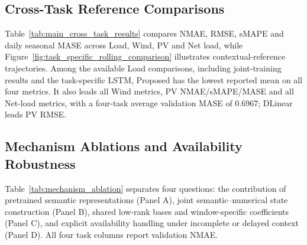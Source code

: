 \documentclass[journal]{IEEEtran}
\begin{document}
\subsection{Cross-Task Reference Comparisons}

Table~\ref{tab:main_cross_task_results} compares NMAE, RMSE, sMAPE and daily seasonal MASE across Load, Wind, PV and Net load, while Figure~\ref{fig:task_specific_rolling_comparison} illustrates contextual-reference trajectories. Among the available Load comparisons, including joint-training results and the task-specific LSTM, Proposed has the lowest reported mean on all four metrics. It also leads all Wind metrics, PV NMAE/sMAPE/MASE and all Net-load metrics, with a four-task average validation MASE of $0.6967$; DLinear leads PV RMSE.








\subsection{Mechanism Ablations and Availability Robustness}
\label{sec:mechanism_ablation}

Table~\ref{tab:mechanism_ablation} separates four questions: the contribution of pretrained semantic representations (Panel A), joint semantic--numerical state construction (Panel B), shared low-rank bases and window-specific coefficients (Panel C), and explicit availability handling under incomplete or delayed context (Panel D). All four task columns report validation NMAE.
\end{document}
